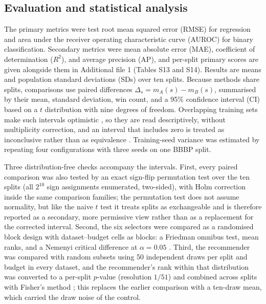 \subsection{Evaluation and statistical analysis}\label{subsec:evaluation}

The primary metrics were test root mean squared error (RMSE) for regression and area under the receiver operating characteristic curve (AUROC) for binary classification. Secondary metrics were mean absolute error (MAE), coefficient of determination ($R^2$), and average precision (AP), and per-split primary scores are given alongside them in Additional file 1 (Tables S13 and S14). Results are means and population standard deviations (SDs) over ten splits. Because methods share splits, comparisons use paired differences $\Delta_s=m_A(s)-m_B(s)$, summarised by their mean, standard deviation, win count, and a 95\% confidence interval (CI) based on a $t$ distribution with nine degrees of freedom. Overlapping training sets make such intervals optimistic \cite{nadeau2003inference,dietterich1998tests}, so they are read descriptively, without multiplicity correction, and an interval that includes zero is treated as inconclusive rather than as equivalence \cite{ash2025comparison}. Training-seed variance was estimated by repeating four configurations with three seeds on one BBBP split.

Three distribution-free checks accompany the intervals. First, every paired comparison was also tested by an exact sign-flip permutation test over the ten splits (all $2^{10}$ sign assignments enumerated, two-sided), with Holm correction inside the same comparison families; the permutation test does not assume normality, but like the naive $t$ test it treats splits as exchangeable and is therefore reported as a secondary, more permissive view rather than as a replacement for the corrected interval. Second, the six selectors were compared as a randomised block design with dataset--budget cells as blocks: a Friedman omnibus test, mean ranks, and a Nemenyi critical difference at $\alpha=0.05$ \cite{demsar2006statistical}. Third, the recommender was compared with random subsets using 50 independent draws per split and budget in every dataset, and the recommender's rank within that distribution was converted to a per-split $p$-value (resolution $1/51$) and combined across splits with Fisher's method \cite{fisher1932statistical}; this replaces the earlier comparison with a ten-draw mean, which carried the draw noise of the control.

